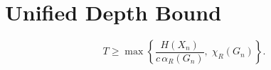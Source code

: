 \section{Unified Depth Bound}

\begin{theorem}
\[
T \ge \max\!\left\{
\frac{H(X_n)}{c\,\alpha_R(G_n)},
\;
\chi_R(G_n)
\right\}.
\]
\end{theorem}
